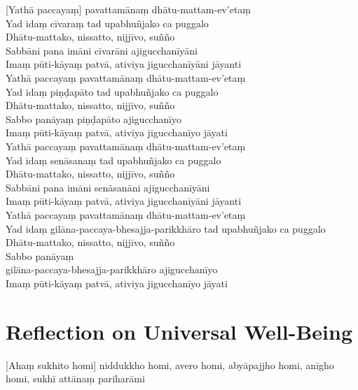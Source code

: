 [Yathā paccayaṃ] pavattamānaṃ dhātu-mattam-ev'etaṃ\\
Yad idaṃ cīvaraṃ tad upabhuñjako ca puggalo\\
Dhātu-mattako, nissatto, nijjīvo, suñño\\
Sabbāni pana imāni cīvarāni ajigucchanīyāni\\
Imaṃ pūti-kāyaṃ patvā, ativiya jigucchanīyāni jāyanti\\
Yathā paccayaṃ pavattamānaṃ dhātu-mattam-ev'etaṃ\\
Yad idaṃ piṇḍapāto tad upabhuñjako ca puggalo\\
Dhātu-mattako, nissatto, nijjīvo, suñño\\
Sabbo panāyaṃ piṇḍapāto ajigucchanīyo\\
Imaṃ pūti-kāyaṃ patvā, ativiya jigucchanīyo jāyati\\
Yathā paccayaṃ pavattamānaṃ dhātu-mattam-ev'etaṃ\\
Yad idaṃ senāsanaṃ tad upabhuñjako ca puggalo\\
Dhātu-mattako, nissatto, nijjīvo, suñño\\
Sabbāni pana imāni senāsanāni ajigucchanīyāni\\
Imaṃ pūti-kāyaṃ patvā, ativiya jigucchanīyāni jāyanti\\
Yathā paccayaṃ pavattamānaṃ dhātu-mattam-ev'etaṃ\\
Yad idaṃ gilāna-paccaya-bhesajja-parikkhāro tad upabhuñjako ca puggalo\\
Dhātu-mattako, nissatto, nijjīvo, suñño\\
Sabbo panāyaṃ\\
gilāna-paccaya-bhesajja-parikkhāro ajigucchanīyo\\
Imaṃ pūti-kāyaṃ patvā, ativiya jigucchanīyo jāyati


\section{Reflection on Universal Well-Being}


\begin{leader}
\end{leader}


[Ahaṃ sukhito homi] niddukkho homi, avero homi, abyāpajjho homi, anīgho homi,
sukhī attānaṃ pariharāmi

